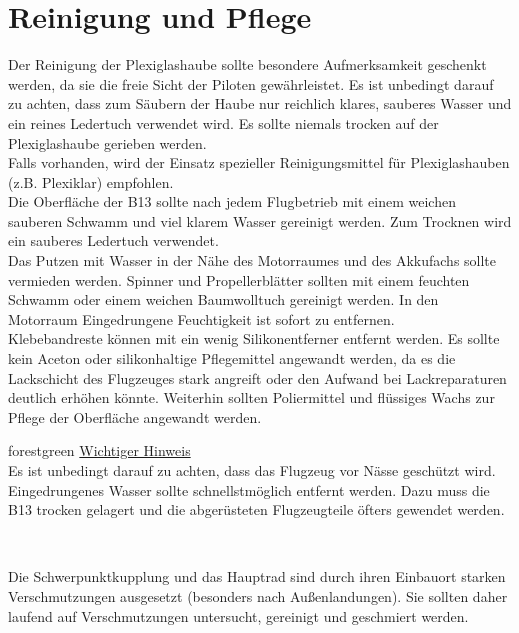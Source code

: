 \section{Reinigung und Pflege}
Der Reinigung der Plexiglashaube sollte besondere Aufmerksamkeit geschenkt werden, da sie die freie Sicht der Piloten gewährleistet. Es ist unbedingt darauf zu achten, dass zum Säubern der Haube nur reichlich klares, sauberes Wasser und ein reines Ledertuch verwendet wird. Es sollte niemals trocken auf der Plexiglashaube gerieben werden. \\
\newline
Falls vorhanden, wird der Einsatz spezieller Reinigungsmittel für Plexiglashauben (z.B. Plexiklar) empfohlen. \\
\newline
Die Oberfläche der B13 sollte nach jedem Flugbetrieb mit einem weichen sauberen Schwamm und viel klarem Wasser gereinigt werden. Zum Trocknen wird ein sauberes Ledertuch verwendet. \\
\newline
Das Putzen mit Wasser in der Nähe des Motorraumes und des Akkufachs sollte vermieden werden. Spinner und Propellerblätter sollten mit einem feuchten Schwamm oder einem weichen Baumwolltuch gereinigt werden.
In den Motorraum Eingedrungene Feuchtigkeit ist sofort zu entfernen.\\
Klebebandreste können mit ein wenig Silikonentferner entfernt werden. Es sollte kein Aceton oder silikonhaltige Pflegemittel angewandt werden, da es die Lackschicht des Flugzeuges stark angreift oder den Aufwand bei Lackreparaturen deutlich erhöhen könnte. Weiterhin sollten Poliermittel und flüssiges Wachs zur Pflege der Oberfläche angewandt werden. \\
\newline
\begin{color}{forestgreen}
\large{\underline{Wichtiger Hinweis}}\\
Es ist unbedingt darauf zu achten, dass das Flugzeug vor Nässe geschützt wird. 	Eingedrungenes Wasser sollte schnellstmöglich entfernt werden. Dazu muss die B13 trocken gelagert und die abgerüsteten Flugzeugteile  öfters gewendet 	werden. 
\end{color}\\
\newline

Die Schwerpunktkupplung und das Hauptrad sind durch ihren Einbauort starken Verschmutzungen ausgesetzt (besonders nach Außenlandungen). Sie sollten daher laufend auf Verschmutzungen untersucht, gereinigt und geschmiert werden. 